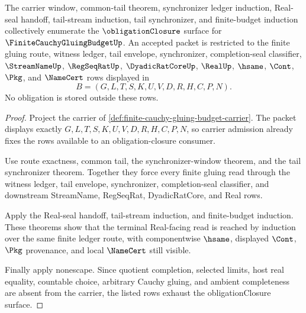 \begin{theorem}
\label{thm:finite-cauchy-gluing-budget-obligation-closure}
The carrier window, common-tail theorem, synchronizer ledger induction, Real-seal handoff, tail-stream induction, tail synchronizer, and finite-budget induction collectively enumerate the $\obligationClosure$ surface for $\FiniteCauchyGluingBudgetUp$. An accepted packet is restricted to the finite gluing route, witness ledger, tail envelope, synchronizer, completion-seal classifier, $\StreamNameUp$, $\RegSeqRatUp$, $\DyadicRatCoreUp$, $\RealUp$, $\hsame$, $\Cont$, $\Pkg$, and $\NameCert$ rows displayed in
$$
B=(G,L,T,S,K,U,V,D,R,H,C,P,N).
$$
No obligation is stored outside these rows.
\end{theorem}
\begin{proof}
Project the carrier of \autoref{def:finite-cauchy-gluing-budget-carrier}. The packet displays exactly $G,L,T,S,K,U,V,D,R,H,C,P,N$, so carrier admission already fixes the rows available to an obligation-closure consumer.

Use route exactness, common tail, the synchronizer-window theorem, and the tail synchronizer theorem. Together they force every finite gluing read through the witness ledger, tail envelope, synchronizer, completion-seal classifier, and downstream StreamName, RegSeqRat, DyadicRatCore, and Real rows.

Apply the Real-seal handoff, tail-stream induction, and finite-budget induction. These theorems show that the terminal Real-facing read is reached by induction over the same finite ledger route, with componentwise $\hsame$, displayed $\Cont$, $\Pkg$ provenance, and local $\NameCert$ still visible.

Finally apply nonescape. Since quotient completion, selected limits, host real equality, countable choice, arbitrary Cauchy gluing, and ambient completeness are absent from the carrier, the listed rows exhaust the obligationClosure surface.
\end{proof}



